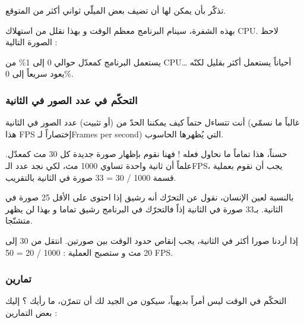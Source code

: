 \begin{information}
تذكّر بأن
يمكن لها أن تضيف بعض الميلّي ثواني أكثر من المتوقع.
\end{information}

بهذه الشفرة، سينام البرنامج معظم الوقت و بهذا نقلل من استهلاك
\textenglish{CPU}.
لاحظ الصورة التالية :


يستعمل البرنامج كمعدّل حوالي 0 إلى 1\% من 
\textenglish{CPU}\dots
أحياناً يستعمل أكثر بقليل لكنّه يعود سريعاً إلى 0\%.

\subsubsection{التحكّم في عدد الصور في الثانية}

أنت تتساءل حتماً كيف يمكننا الحدّ من (أو تثبيت) عدد الصور في الثانية (غالباً ما نسمّي هذا
\textenglish{FPS}
إختصاراً لـ\textenglish{Frames per second})
التي يُظهرها الحاسوب.

حسناً، هذا تماماً ما نحاول فعله ! فهنا نقوم بإظهار صورة جديدة كل 30 مث كمعدّل. علماً أن ثانية واحدة تساوي 1000 مث، لكي نجد عدد الـ\textenglish{FPS}،
يجب أن نقوم بعملية قسمة
1000 / 30 = 33
 صورة في الثانية بالتقريب.
 
بالنسبة لعين الإنسان، نقول عن التحرّك أنه رشيق إذا احتوى على الأقل 25 صورة في الثانية. بـ33 صورة في الثانية إذاً فالتحرّك في البرنامج رشيق تماما و بهذا لن يظهر متشنّجا. 

إذا أردنا صورا أكثر في الثانية، يجب إنقاص حدود الوقت بين صورتين. انتقل من 30 إلى 20 مث و ستصبح العملية :
1000 / 20 = 50 \textenglish{FPS}.

\subsubsection{تمارين}
التحكّم في الوقت ليس أمراً بديهياً، سيكون من الجيد لك أن تتمرّن، ما رأيك ؟ إليك بعض التمارين :

